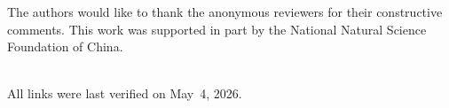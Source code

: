 \documentclass[conference,a4paper]{IEEEtran}[2015/08/26]
\begin{document}
The authors would like to thank the anonymous reviewers for their
constructive comments. This work was supported in part by the National
Natural Science Foundation of China.


\clearpage     %



\ \\
\noindent All links were last verified on May~4, 2026.
\end{document}
